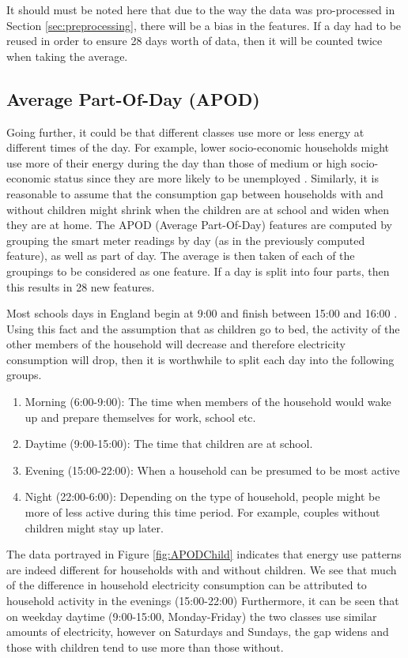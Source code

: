 It should must be noted here that due to the way the data was pro-processed in Section \ref{sec:preprocessing}, there will be a bias in the features. If a day had to be reused in order to ensure 28 days worth of data, then it will be counted twice when taking the average. 

\subsection*{Average Part-Of-Day (APOD)}
Going further, it could be that different classes use more or less energy at different times of the day. For example, lower socio-economic households might use more of their energy during the day than those of medium or high socio-economic status since they are more likely to be unemployed \cite{Bartley}. Similarly, it is reasonable to assume that the consumption gap between households with and without children might shrink when the children are at school and widen when they are at home. The APOD (Average Part-Of-Day) features are computed by grouping the smart meter readings by day (as in the previously computed feature), as well as part of day. The average is then taken of each of the groupings to be considered as one feature. If a day is split into four parts, then this results in 28 new features.

Most schools days in England begin at 9:00 and finish between 15:00 and 16:00 \cite{school_times}. Using this fact and the assumption that as children go to bed, the activity of the other members of the household will decrease and therefore electricity consumption will drop, then it is worthwhile to split each day into the following groups.
\begin{enumerate}
\item Morning (6:00-9:00): The time when members of the household would wake up and prepare themselves for work, school etc.
\item Daytime (9:00-15:00): The time that children are at school.
\item Evening (15:00-22:00):  When a household can be presumed to be most active
\item Night (22:00-6:00): Depending on the type of household, people might be more of less active during this time period. For example, couples without children might stay up later.
\end{enumerate}
\APODChild %


The data portrayed in Figure \ref{fig:APODChild} indicates that energy use patterns are indeed different for households with and without children. We see that much of the difference in household electricity consumption can be attributed to household activity in the evenings (15:00-22:00) Furthermore, it can be seen that on weekday daytime (9:00-15:00, Monday-Friday) the two classes use similar amounts of electricity, however on Saturdays and Sundays, the gap widens and those with children tend to use more than those without. 

